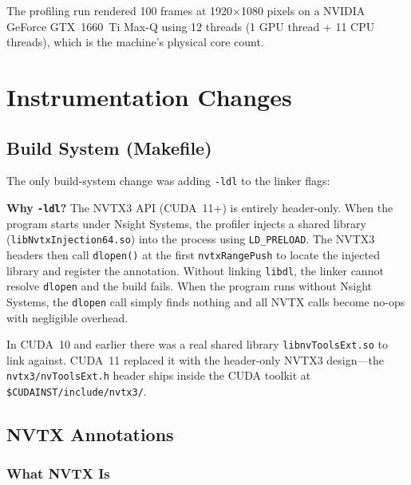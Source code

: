 \documentclass[
	english,
	letterpaper, oneside
]{article}
\begin{document}
The profiling run rendered 100 frames at 1920$\times$1080 pixels on a
NVIDIA GeForce GTX~1660~Ti Max-Q using 12 threads (1 GPU thread +
11 CPU threads), which is the machine's physical core count.

\section{Instrumentation Changes}

\subsection{Build System (Makefile)}

The only build-system change was adding \texttt{-ldl} to the linker flags:


\textbf{Why \texttt{-ldl}?} The NVTX3 API (CUDA~11+) is entirely
header-only. When the program starts under Nsight Systems, the profiler
injects a shared library (\texttt{libNvtxInjection64.so}) into the process
using \texttt{LD\_PRELOAD}. The NVTX3 headers then call \texttt{dlopen()}
at the first \texttt{nvtxRangePush} to locate the injected library and
register the annotation. Without linking \texttt{libdl}, the linker cannot
resolve \texttt{dlopen} and the build fails. When the program runs
without Nsight Systems, the \texttt{dlopen} call simply finds
nothing and all NVTX calls become no-ops with negligible overhead.

In CUDA~10 and earlier there was a real shared library
\texttt{libnvToolsExt.so} to link against. CUDA~11 replaced it with the
header-only NVTX3 design—the \texttt{nvtx3/nvToolsExt.h} header ships
inside the CUDA toolkit at \texttt{\$CUDAINST/include/nvtx3/}.

\subsection{NVTX Annotations}

\subsubsection{What NVTX Is}
\end{document}
